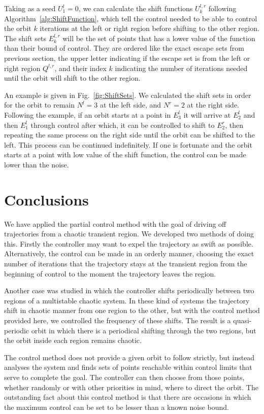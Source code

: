 Taking as a seed $U^l_1 = 0$,  we can calculate the shift functions $U^{l,r}_k$ following Algorithm~\ref{alg:ShiftFunction}, which tell the control needed to be able to control the orbit $k$ iterations at the left or right region before shifting to the other region.  The shift sets $E^{l,r}_k$ will be the set of points that has a lower value of the function than their bound of control. They are ordered like the exact escape sets from previous section, the upper letter indicating if the escape set is from the left or right region $Q^{l,r}$, and their index $k$ indicating the number of iterations needed until the orbit will shift to the other region. 

An example is given in Fig.~\ref{fig:ShiftSets}. We calculated the shift sets in order for the orbit to remain $N^l = 3$ at the left side, and $N^r = 2$ at the right side. Following the example, if an orbit starts at a point in $E^l_3$ it will arrive at $E^l_2$ and then $E^l_1$ through control after which, it can be controlled to shift to $E^r_2$, then repeating the same process on the right side until the orbit can be shifted to the left. This process can be continued indefinitely. If one is fortunate and the orbit starts at a point with low value of the shift function, the control can be made lower than the noise.


\section{Conclusions}

We have applied the partial control method with the goal of driving off trajectories from a chaotic transient region. We developed two methods of doing this. Firstly the controller may want to expel the trajectory as swift as possible. Alternatively, the control can be made in an orderly manner, choosing the exact number of iterations that the trajectory stays at the transient region from the beginning of control to the moment the trajectory leaves the region.

Another case was studied in which the controller shifts periodically between two regions of a multistable chaotic system. In these kind of systems the trajectory shift in chaotic manner from one region to the other, but with the control method provided here, we controlled the frequency of these shifts. The result is a quasi-periodic orbit in which there is a periodical shifting through the two regions, but the orbit inside each region remains chaotic.

The control method does not provide a given orbit to follow strictly, but instead analyses the system and finds sets of points reachable within control limits that serve to complete the goal. The controller can then choose from those points, whether randomly or with other priorities in mind, where to direct the orbit. The outstanding fact about this control method is that there are occasions in which the maximum control can be set to be lesser than a known noise bound.


